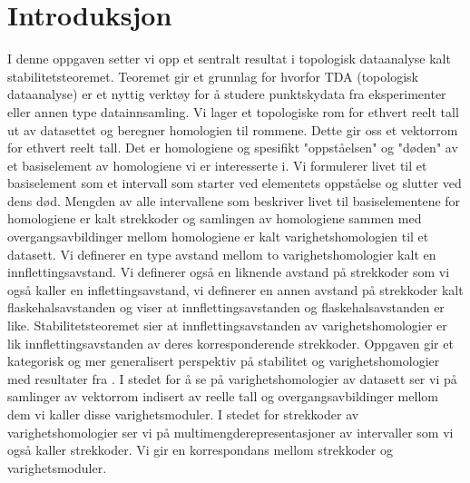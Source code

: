 \section{Introduksjon}

I denne oppgaven setter vi opp et sentralt resultat
i topologisk dataanalyse kalt stabilitetsteoremet.
Teoremet gir et grunnlag for hvorfor TDA (topologisk
dataanalyse) er et nyttig verktøy for å studere
punktskydata fra eksperimenter eller annen type
datainnsamling. Vi lager et topologiske rom for ethvert
reelt tall ut av datasettet og beregner homologien til
rommene. Dette gir oss et vektorrom for ethvert reelt
tall. Det er homologiene og spesifikt "oppståelsen" og
"døden" av et basiselement av homologiene vi er
interesserte i. Vi formulerer livet til et basiselement
som et intervall som starter ved elementets oppståelse og
slutter ved dens død. Mengden av alle intervallene som
beskriver livet til basiselementene for homologiene er
kalt strekkoder og samlingen av homologiene sammen med
overgangsavbildinger mellom homologiene er kalt
varighetshomologien til et datasett. Vi definerer en type
avstand mellom to varighetshomologier kalt en
innflettingsavstand. Vi definerer også en liknende avstand
på strekkoder som vi også kaller en inflettingsavstand, vi
definerer en annen avstand på strekkoder kalt
flaskehalsavstanden og viser at innflettingsavstanden og
flaskehalsavstanden er like. Stabilitetsteoremet sier at
innflettingsavstanden av varighetshomologier er lik
innflettingsavstanden av deres korresponderende
strekkoder. Oppgaven gir et kategorisk og mer generalisert
perspektiv på stabilitet og varighetshomologier med
resultater fra \citep{Bauer2020}. I stedet
for å se på varighetshomologier av datasett ser vi på
samlinger av vektorrom indisert av reelle tall og
overgangsavbildinger mellom dem vi kaller disse
varighetsmoduler. I stedet for strekkoder
av varighetshomologier ser vi på
multimengderepresentasjoner av intervaller som vi også
kaller strekkoder. Vi gir en korrespondans mellom
strekkoder og varighetsmoduler.
